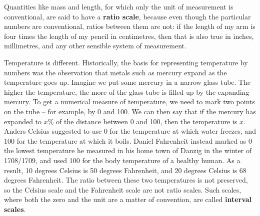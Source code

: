 Quantities like mass and length, for which only the unit of
measurement is conventional, are said to have a \textbf{ratio scale},
because even though the particular numbers are conventional, ratios
between them are not: if the length of my arm is four times the length
of my pencil in centimetres, then that is also true in inches,
millimetres, and any other sensible system of measurement.

Temperature is different. Historically, the basis for representing temperature
by numbers was the observation that metals such as mercury expand as the
temperature goes up. Imagine we put some mercury in a narrow glass tube. The
higher the temperature, the more of the glass tube is filled up by the expanding
mercury. To get a numerical measure of temperature, we need to mark two points
on the tube -- for example, by 0 and 100. We can then say that if the mercury
has expanded to $x\%$ of the distance between 0 and 100, then the temperature is
$x$. Anders Celsius suggested to use 0 for the temperature at which water
freezes, and 100 for the temperature at which it boils. Daniel Fahrenheit
instead marked as 0 the lowest temperature he measured in his home town of
Danzig in the winter of 1708/1709, and used 100 for the body temperature of a
healthy human. As a result, 10 degrees Celsius is 50 degrees Fahrenheit, and 20
degrees Celsius is 68 degrees Fahrenheit. The ratio between these two
temperatures is not preserved, so the Celsius scale and the Fahrenheit scale are
not ratio scales.%
Such scales, where both the zero and the unit are a matter of convention, are
called \textbf{interval scales}.



